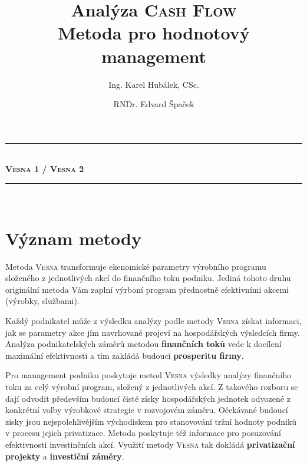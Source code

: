 \documentclass [10pt, fancyhdr, twoside] {article}
\newcounter {note}
\begin{document}
\title{Analýza \textsc{Cash Flow} \\
  \large Metoda pro hodnotový management \\
}


\author{
  Ing. Karel Hubálek, CSc.
  \and
  RNDr. Edvard Špaček
}
\date{}


\maketitle

\newcommand\HRule{\rule{\textwidth}{1pt}}

\begin{center}

\HRule \\[0.4cm]
{ \huge \bfseries \textsc{\LARGE Vesna 1} / \textsc{\LARGE Vesna 2}  }\\[0.4cm]

\HRule \\[2cm]

\end{center}


\section{Význam metody}

Metoda \textsc{Vesna} transformuje ekenomické parametry výrobního programu složeného z jednotlivých akcí do finančního toku podniku. Jediná tohoto druhu originální metoda Vám zaplní výrboní program přednostně efektivními akcemi (výrobky, službami).

Každý podnikatel může z výsledku analýzy podle metody \textsc{Vesna} získat informaci, jak se parametry akce jím navrhované projeví na hospodářských výsledcích firmy. Analýza podnikatelských záměrů metodou \textbf{finančních toků} vede k docílení maximální efektivnosti a tím zakládá budoucí \textbf{prosperitu firmy}.

Pro management podniku poskytuje metod \textsc{Vesna} výsledky analýzy finančního toku  za celý výrobní program, složený z jednotlivých akcí. Z takového rozboru se dají odvodit především budoucí čisté získy hospodářských jednotek odvozené z konkrétní volby výrobkové strategie v rozvojovém záměru. Očekávané budoucí zisky jsou nejspolehlivějším východiskem pro stanovování tržní hodnoty podniků v procesu jejich privatizace. Metoda poskytuje též informace pro posuzování efektivnosti investinčních akcí. Využití metody \textsc{Vesna} tak dokládá \textbf{privatizační projekty} a \textbf{investiční záměry}.
\end{document}
